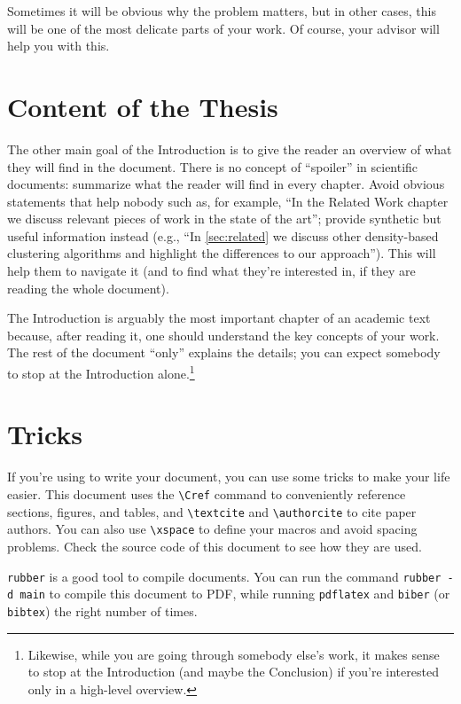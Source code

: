 Sometimes it will be obvious why the problem matters, but in other cases, this will be
one of the most delicate parts of your work. Of course, your advisor will help you with this.

\section{Content of the Thesis}

The other main goal of the Introduction is to give the reader an overview of what they will
find in the document. There is no concept of ``spoiler'' in scientific documents: summarize
what the reader will find in every chapter. Avoid obvious statements that help nobody such as, for example, ``In the Related Work chapter we discuss relevant pieces of work in the state of the art''; provide synthetic but useful information instead (e.g., ``In \cref{sec:related} we discuss other density-based clustering algorithms and highlight the differences to our approach''). This will help them to navigate it (and to find what they're interested in, if they are reading the whole document).

The Introduction is arguably the most important
chapter of an academic text because, after reading it,
one should understand the key concepts of your work. The rest of the document
``only'' explains the details; you can expect somebody to stop at the Introduction alone.\footnote{Likewise, while you are going through somebody else's work, it makes sense to stop at the Introduction (and maybe the Conclusion) if you're interested only in a high-level overview.}

\section{\latex Tricks}

If you're using \latex to write your document, you can use some tricks to make your life
easier. This document uses the \verb|\Cref| command to conveniently reference sections, figures, and tables, and \verb|\textcite| and
\verb|\authorcite| to cite paper authors. You can also use \verb|\xspace| to define your macros
and avoid spacing problems. Check the source code of this document to see how they are used.

\texttt{rubber} is a good tool to compile \latex documents. You can run the command
\texttt{rubber -d main} to compile this document to PDF, while running \texttt{pdflatex}
and \texttt{biber} (or \texttt{bibtex}) the right number of times.

